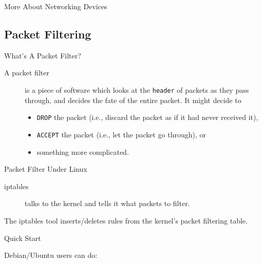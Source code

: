 \begin{frame}{More About Networking Devices}
  \begin{refsection}
    \nocite{wiki:router, wiki:routingtable, wiki:switch, wiki:lanswitching,}
    \printbibliography[heading=none]
  \end{refsection}
\end{frame}

\subsection{Packet Filtering}

\begin{frame}{What's A Packet Filter?}
  \begin{description}
  \item[A packet filter] is a piece of software which looks at the
    \texttt{header} of packets as they pass through, and decides the
    fate of the entire packet. It might decide to
    \begin{itemize}
    \item \texttt{DROP} the packet (i.e., discard the packet as if it
      had never received it),
    \item \texttt{ACCEPT} the packet (i.e., let the packet go
      through), or
    \item something more complicated.
    \end{itemize}
  \end{description}
\end{frame}

\begin{frame}{Packet Filter Under Linux}
  \begin{description}
  \item[iptables] talks to the kernel and tells it what packets to filter.
  \end{description}
  The iptables tool inserts/deletes rules from the kernel's packet filtering table.
\end{frame}

\begin{frame}{Quick Start}
  \begin{iblock}{Debian/Ubuntu users can do:}
    \begin{center}
    \end{center}
  \end{iblock}
\end{frame}

